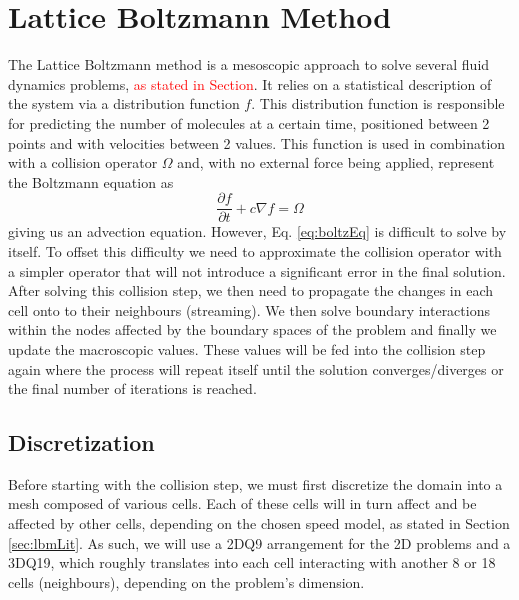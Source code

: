 \documentclass[12pt]{book}
\begin{document}
\section{Lattice Boltzmann Method}
The Lattice Boltzmann method is a mesoscopic approach to solve several fluid dynamics problems, \textcolor{red}{as stated in Section}. It relies on a statistical description of the system via a distribution function $f$. This distribution function is responsible for predicting the number of molecules at a certain time, positioned between 2 points and with velocities between 2 values. This function is used in combination with a collision operator $\Omega$ and, with no external force being applied, represent the Boltzmann equation as
\begin{equation}\label{eq:boltzEq}
\frac{\partial f}{\partial t} + c \nabla f = \Omega
\end{equation}
giving us an advection equation. 
However, Eq. \ref{eq:boltzEq} is difficult to solve by itself. To offset this difficulty we need to approximate the collision operator with a simpler operator that will not introduce a significant error in the final solution. After solving this collision step, we then need to propagate the changes in each cell onto to their neighbours (streaming). We then solve boundary interactions within the nodes affected by the boundary spaces of the problem and finally we update the macroscopic values. These values will be fed into the collision step again where the process will repeat itself until the solution converges/diverges or the final number of iterations is reached.
\subsection{Discretization}
Before starting with the collision step, we must first discretize the domain into a mesh composed of various cells. Each of these cells will in turn affect and be affected by other cells, depending on the chosen speed model, as stated in Section \ref{sec:lbmLit}. As such, we will use a 2DQ9 arrangement for the 2D problems and a 3DQ19, which roughly translates into each cell interacting with another 8 or 18 cells (neighbours), depending on the problem's dimension.
\end{document}
